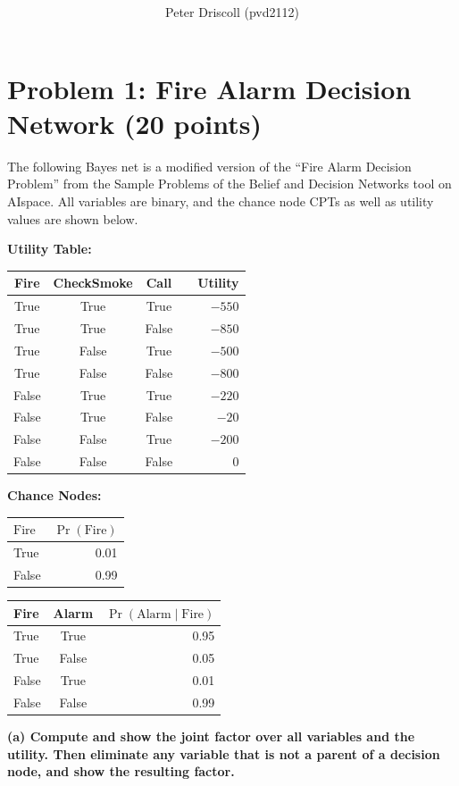 \documentclass[11pt]{article}
\title{%
  \titlefont{COMS W4701: Artificial Intelligence, Spring 2025}\\
  \subtitlefont{Homework \#5}%
}
\author{Peter Driscoll (pvd2112)}
\begin{document}
\section*{Problem 1: Fire Alarm Decision Network (20 points)}

The following Bayes net is a modified version of the “Fire Alarm Decision Problem” from the Sample Problems of the Belief and Decision Networks tool on AIspace. All variables are binary, and the chance node CPTs as well as utility values are shown below.

\textbf{Utility Table:}
\begin{table}[H]
\centering
\begin{tabular}{ccccr}
\toprule
Fire & CheckSmoke & Call & & Utility\\
\midrule
True  & True  & True  & & $-550$\\
True  & True  & False & & $-850$\\
True  & False & True  & & $-500$\\
True  & False & False & & $-800$\\
False & True  & True  & & $-220$\\
False & True  & False & & $-20$\\
False & False & True  & & $-200$\\
False & False & False & & $0$\\
\bottomrule
\end{tabular}
\end{table}

\bigskip
\textbf{Chance Nodes:}
\begin{table}[H]
\centering
\begin{tabular}{lr}
\toprule
$\text{Fire}$ & $\Pr(\text{Fire})$\\
\midrule
True  & 0.01\\
False & 0.99\\
\bottomrule
\end{tabular}
\quad
\begin{tabular}{lcr}
\toprule
Fire & Alarm & $\Pr(\text{Alarm}\mid\text{Fire})$\\
\midrule
True  & True  & 0.95\\
True  & False & 0.05\\
False & True  & 0.01\\
False & False & 0.99\\
\bottomrule
\end{tabular}
\end{table}

\bigskip
\textbf{(a) Compute and show the joint factor over all variables and the utility. Then eliminate any variable that is not a parent of a decision node, and show the resulting factor.}
\end{document}
